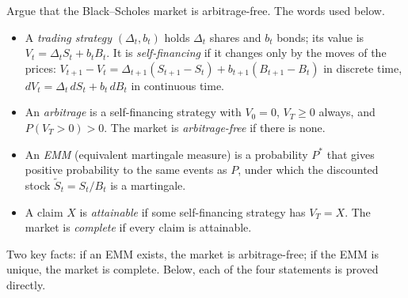 \begin{problem}[Q2(c)]
Argue that the Black--Scholes market is arbitrage-free.
\cardsays The words used below.
\begin{itemize}
\item A \emph{trading strategy} $(\Delta_t,b_t)$ holds $\Delta_t$ shares and $b_t$ bonds; its value is $V_t=\Delta_tS_t+b_tB_t$. It is \emph{self-financing} if it changes only by the moves of the prices: $V_{t+1}-V_t=\Delta_{t+1}(S_{t+1}-S_t)+b_{t+1}(B_{t+1}-B_t)$ in discrete time, $dV_t=\Delta_t\,dS_t+b_t\,dB_t$ in continuous time.
\item An \emph{arbitrage} is a self-financing strategy with $V_0=0$, $V_T\ge0$ always, and $P(V_T>0)>0$. The market is \emph{arbitrage-free} if there is none.
\item An \emph{EMM} (equivalent martingale measure) is a probability $P^*$ that gives positive probability to the same events as $P$, under which the discounted stock $\tilde S_t=S_t/B_t$ is a martingale.
\item A claim $X$ is \emph{attainable} if some self-financing strategy has $V_T=X$. The market is \emph{complete} if every claim is attainable.
\end{itemize}
Two key facts: if an EMM exists, the market is arbitrage-free; if the EMM is unique, the market is complete. Below, each of the four statements is proved directly.
\working


\end{problem}
